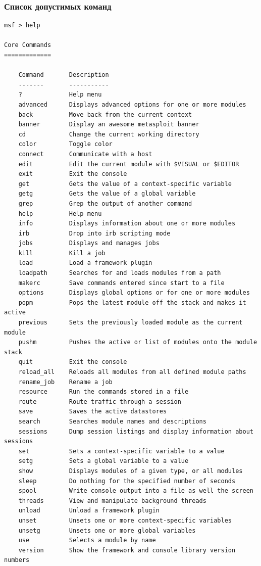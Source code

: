 \documentclass[10pt,a4paper]{report}
\begin{document}
\subsubsection{Список допустимых команд}
\begin{verbatim}
msf > help

Core Commands
=============

    Command       Description
    -------       -----------
    ?             Help menu
    advanced      Displays advanced options for one or more modules
    back          Move back from the current context
    banner        Display an awesome metasploit banner
    cd            Change the current working directory
    color         Toggle color
    connect       Communicate with a host
    edit          Edit the current module with $VISUAL or $EDITOR
    exit          Exit the console
    get           Gets the value of a context-specific variable
    getg          Gets the value of a global variable
    grep          Grep the output of another command
    help          Help menu
    info          Displays information about one or more modules
    irb           Drop into irb scripting mode
    jobs          Displays and manages jobs
    kill          Kill a job
    load          Load a framework plugin
    loadpath      Searches for and loads modules from a path
    makerc        Save commands entered since start to a file
    options       Displays global options or for one or more modules
    popm          Pops the latest module off the stack and makes it active
    previous      Sets the previously loaded module as the current module
    pushm         Pushes the active or list of modules onto the module stack
    quit          Exit the console
    reload_all    Reloads all modules from all defined module paths
    rename_job    Rename a job
    resource      Run the commands stored in a file
    route         Route traffic through a session
    save          Saves the active datastores
    search        Searches module names and descriptions
    sessions      Dump session listings and display information about sessions
    set           Sets a context-specific variable to a value
    setg          Sets a global variable to a value
    show          Displays modules of a given type, or all modules
    sleep         Do nothing for the specified number of seconds
    spool         Write console output into a file as well the screen
    threads       View and manipulate background threads
    unload        Unload a framework plugin
    unset         Unsets one or more context-specific variables
    unsetg        Unsets one or more global variables
    use           Selects a module by name
    version       Show the framework and console library version numbers



\end{verbatim}
\end{document}
